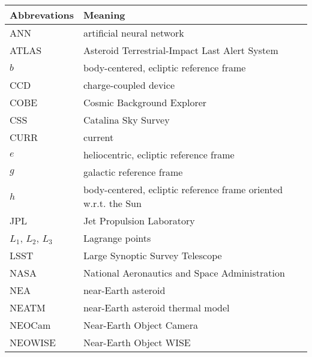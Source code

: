 \begin{table}[h!]
\centering
\begin{tabular}{l|l}
\textbf{Abbrevations} & \textbf{Meaning}                                                \\ \hline
ANN                   & artificial neural network                                       \\
ATLAS                 & Asteroid Terrestrial-Impact Last Alert System                   \\
$b$                     & body-centered, ecliptic reference frame                         \\
CCD                   & charge-coupled device                                           \\
COBE                  & Cosmic Background Explorer                                      \\
CSS                   & Catalina Sky Survey                                             \\
CURR                  & current                                                         \\
$e$                     & heliocentric, ecliptic reference frame                          \\
$g$                     & galactic reference frame                                        \\
$h$                     & body-centered, ecliptic reference frame oriented w.r.t. the Sun \\
JPL                   & Jet Propulsion Laboratory                                       \\
$L_1$, $L_2$, $L_3$            & Lagrange points                                                 \\
LSST                  & Large Synoptic Survey Telescope                                 \\
NASA                  & National Aeronautics and Space Administration                   \\
NEA                   & near-Earth asteroid                                             \\
NEATM                 & near-Earth asteroid thermal model                               \\
NEOCam                & Near-Earth Object Camera                                        \\
NEOWISE               & Near-Earth Object WISE                                          \\

\end{tabular}
\end{table}
